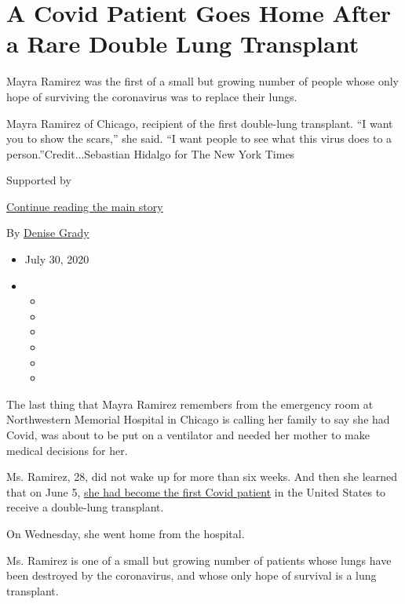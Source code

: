 \hypertarget{a-covid-patient-goes-home-after-a-rare-double-lung-transplant}{%
\section{A Covid Patient Goes Home After a Rare Double Lung
Transplant}\label{a-covid-patient-goes-home-after-a-rare-double-lung-transplant}}

Mayra Ramirez was the first of a small but growing number of people
whose only hope of surviving the coronavirus was to replace their lungs.

Mayra Ramirez of Chicago, recipient of the first double-lung transplant.
``I want you to show the scars,'' she said. ``I want people to see what
this virus does to a person.''Credit...Sebastian Hidalgo for The New
York Times

Supported by

\protect\hyperlink{after-sponsor}{Continue reading the main story}

By \href{https://www.nytimes.com/by/denise-grady}{Denise Grady}

\begin{itemize}
\item
  July 30, 2020
\item
  \begin{itemize}
  \item
  \item
  \item
  \item
  \item
  \item
  \end{itemize}
\end{itemize}

The last thing that Mayra Ramirez remembers from the emergency room at
Northwestern Memorial Hospital in Chicago is calling her family to say
she had Covid, was about to be put on a ventilator and needed her mother
to make medical decisions for her.

Ms. Ramirez, 28, did not wake up for more than six weeks. And then she
learned that on June 5,
\href{https://www.nytimes.com/2020/06/11/health/coronavirus-lung-transplant.html?searchResultPosition=2}{she
had become the first Covid patient} in the United States to receive a
double-lung transplant.

On Wednesday, she went home from the hospital.

Ms. Ramirez is one of a small but growing number of patients whose lungs
have been destroyed by the coronavirus, and whose only hope of survival
is a lung transplant.

